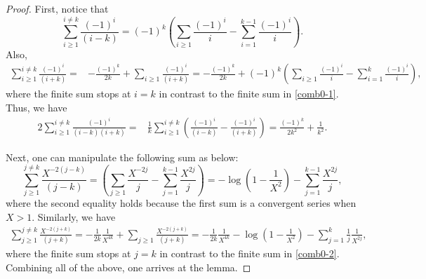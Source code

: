 \documentclass[12pt]{amsart}
\theoremstyle{plain}
\theoremstyle{definition}
\theoremstyle{remark}
\numberwithin{equation}{section}
\begin{document}
\begin{proof}
First, notice that
\begin{equation}
    \sum_{i\geq1}^{i\neq k}\frac{(-1)^i}{(i-k)}=(-1)^k\left(\sum_{i\geq1}\frac{(-1)^i}{i}-\sum_{i=1}^{k-1}\frac{(-1)^i}{i}\right).\label{comb0-1}
\end{equation}
Also,
\begin{align*}
     \sum_{i\geq1}^{i\neq k}\frac{(-1)^i}{(i+k)}=&-\frac{(-1)^k}{2k}+\sum_{i\geq1}\frac{(-1)^i}{(i+k)}=-\frac{(-1)^k}{2k}+(-1)^k\left(\sum_{i\geq1}\frac{(-1)^i}{i}-\sum_{i=1}^{k}\frac{(-1)^i}{i}\right),
\end{align*}
where the finite sum stops at $i=k$ in contrast to the finite sum in \eqref{comb0-1}. Thus, we have
\begin{align*}
   2\sum_{i\geq1}^{i\neq k}\frac{(-1)^i}{(i-k)(i+k)}=&\frac{1}{k}\sum_{i\geq1}^{i\neq k}\left(\frac{(-1)^i}{(i-k)}-\frac{(-1)^i}{(i+k)}\right)=\frac{(-1)^k}{2k^2}+\frac{1}{k^2}.
\end{align*}

Next, one can manipulate the following sum as below:
\begin{equation}
    \sum_{j\geq1}^{j\neq k}\frac{X^{-2(j-k)}}{(j-k)}=\left(\sum_{j\geq1}\frac{X^{-2j}}{j}-\sum_{j=1}^{k-1}\frac{X^{2j}}{j}\right)=-\log\left(1-\frac{1}{X^2}\right)-\sum_{j=1}^{k-1}\frac{X^{2j}}{j},\label{comb0-2}
\end{equation}
where the second equality holds because the first sum is a convergent series when $X>1$. Similarly, we have
\begin{align*}
    \sum_{j\geq1}^{j\neq k}\frac{X^{-2(j+k)}}{(j+k)}=-\frac{1}{2k}\frac{1}{X^{4k}}+  \sum_{j\geq1}\frac{X^{-2(j+k)}}{(j+k)}=-\frac{1}{2k}\frac{1}{X^{4k}}-\log\left(1-\frac{1}{X^2}\right)-\sum_{j=1}^{k}\frac{1}{j}\frac{1}{X^{2j}},
\end{align*}
where the finite sum stops at $j=k$ in contrast to the finite sum in \eqref{comb0-2}. Combining all of the above, one arrives at the lemma.
\end{proof}
\end{document}

